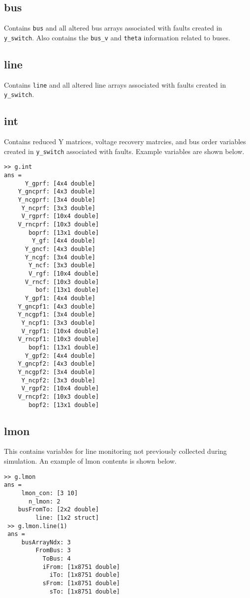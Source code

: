 \subsection{bus}  
Contains \verb|bus| and all altered bus arrays associated with faults created in \verb|y_switch|.
Also contains the \verb|bus_v| and \verb|theta| information related to buses.

\subsection{line}  
Contains \verb|line| and all altered line arrays associated with faults created in \verb|y_switch|.

\subsection{int}  
Contains reduced Y matrices, voltage recovery matrcies, and bus order variables created in \verb|y_switch| associated with faults.
Example variables are shown below.
\begin{verbatim}
>> g.int
ans = 
      Y_gprf: [4x4 double]
    Y_gncprf: [4x3 double]
    Y_ncgprf: [3x4 double]
     Y_ncprf: [3x3 double]
     V_rgprf: [10x4 double]
    V_rncprf: [10x3 double]
       boprf: [13x1 double]
        Y_gf: [4x4 double]
      Y_gncf: [4x3 double]
      Y_ncgf: [3x4 double]
       Y_ncf: [3x3 double]
       V_rgf: [10x4 double]
      V_rncf: [10x3 double]
         bof: [13x1 double]
      Y_gpf1: [4x4 double]
    Y_gncpf1: [4x3 double]
    Y_ncgpf1: [3x4 double]
     Y_ncpf1: [3x3 double]
     V_rgpf1: [10x4 double]
    V_rncpf1: [10x3 double]
       bopf1: [13x1 double]
      Y_gpf2: [4x4 double]
    Y_gncpf2: [4x3 double]
    Y_ncgpf2: [3x4 double]
     Y_ncpf2: [3x3 double]
     V_rgpf2: [10x4 double]
    V_rncpf2: [10x3 double]
       bopf2: [13x1 double]
\end{verbatim}
\subsection{lmon}  
This contains variables for line monitoring not previously collected during simulation.
An example of lmon contents is shown below.
\begin{verbatim}
>> g.lmon
ans = 
     lmon_con: [3 10]
       n_lmon: 2
    busFromTo: [2x2 double]
         line: [1x2 struct]
 >> g.lmon.line(1)
 ans = 
     busArrayNdx: 3
         FromBus: 3
           ToBus: 4
           iFrom: [1x8751 double]
             iTo: [1x8751 double]
           sFrom: [1x8751 double]
             sTo: [1x8751 double]
\end{verbatim}


